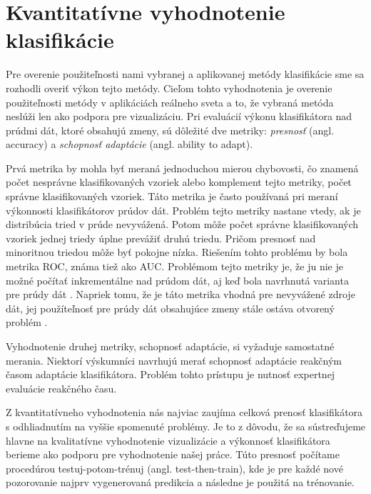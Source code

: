 \section{Kvantitatívne vyhodnotenie klasifikácie}
Pre overenie použiteľnosti nami vybranej a aplikovanej metódy klasifikácie sme sa rozhodli overiť výkon tejto metódy. Cieľom tohto vyhodnotenia je overenie použiteľnosti metódy v aplikáciách reálneho sveta a to, že vybraná metóda neslúži len ako podpora pre vizualizáciu. Pri evaluácií výkonu klasifikátora nad prúdmi dát, ktoré obsahujú zmeny, sú dôležité dve metriky: \textit{presnosť} (angl. accuracy) a \textit{schopnosť adaptácie} (angl. ability to adapt).
\par
Prvá metrika by mohla byť meraná jednoduchou mierou chybovosti, čo znamená počet nesprávne klasifikovaných vzoriek alebo komplement tejto metriky, počet správne klasifikovaných vzoriek. Táto metrika je často používaná pri meraní výkonnosti klasifikátorov prúdov dát. Problém tejto metriky nastane vtedy, ak je distribúcia tried v prúde nevyvážená. Potom môže počet správne klasifikovaných vzoriek jednej triedy úplne prevážiť druhú triedu. Pričom presnosť nad minoritnou triedou môže byť pokojne nízka. Riešením tohto problému by bola metrika ROC, známa tiež ako AUC. Problémom tejto metriky je, že ju nie je možné počítať inkrementálne nad prúdom dát, aj keď bola navrhnutá varianta pre prúdy dát \citep{brzezinski2014prequential}. Napriek tomu, že je táto metrika vhodná pre nevyvážené zdroje dát, jej použíteľnosť pre prúdy dát obsahujúce zmeny stále ostáva otvorený problém \citep{brzezinski2014prequential}.
\par
Vyhodnotenie druhej metriky, schopnosť adaptácie, si vyžaduje samostatné merania. Niektorí výskumníci navrhujú merať schopnosť adaptácie reakčným časom adaptácie klasifikátora. Problém tohto prístupu je nutnosť expertnej evaluácie reakčného času.
\par
Z kvantitatívneho vyhodnotenia nás najviac zaujíma celková prenosť klasifikátora s odhliadnutím na vyššie spomenuté problémy. Je to z dôvodu, že sa sústreďujeme hlavne na kvalitatívne vyhodnotenie vizualizácie a výkonnosť klasifikátora berieme ako podporu pre vyhodnotenie našej práce. Túto presnosť počítame procedúrou testuj-potom-trénuj (angl. test-then-train), kde je pre každé nové pozorovanie najprv vygenerovaná predikcia a následne je použitá na trénovanie.


